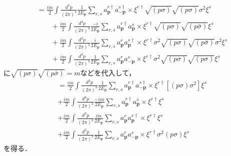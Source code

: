 \begin{align*}
  & = \frac{im}{2} \int \frac{d^3p}{(2\pi)^3} \frac{1}{2E_{\boldsymbol{p}}} \sum_{r, s} a_{\boldsymbol{p}}^{r\dagger} a_{-\boldsymbol{p}}^{s\dagger}
  \times \xi^{r\dagger} \sqrt{(p \sigma)} \sqrt{(p \sigma)} \sigma^2 \xi^s \\
  & \qquad + \frac{im}{2} \int \frac{d^3p}{(2\pi)^3} \frac{-i}{2E_{\boldsymbol{p}}} \sum_{r, s} a_{\boldsymbol{p}}^{r\dagger} a_{\boldsymbol{p}}^{s}
  \times \xi^{r\dagger} \sqrt{(p \sigma)} \sqrt{(p \bar\sigma)} \xi^s \\
  & \qquad + \frac{im}{2} \int \frac{d^3p}{(2\pi)^3} \frac{i}{2E_{\boldsymbol{p}}} \sum_{r, s} a_{\boldsymbol{p}}^{r} a_{\boldsymbol{p}}^{s\dagger}
  \times \xi^{r\dagger} \sigma^2 \sqrt{(p \sigma)} \sqrt{(p \bar\sigma)} \sigma^2 \xi^s \\
  & \qquad + \frac{im}{2} \int \frac{d^3p}{(2\pi)^3} \frac{1}{2E_{\boldsymbol{p}}} \sum_{r, s} a_{\boldsymbol{p}}^{r} a_{-\boldsymbol{p}}^{s}
  \times \xi^{r\dagger} \sigma^2 \sqrt{(p \sigma)} \sqrt{(p \sigma)} \xi^s
\end{align*}
に$\sqrt{(p \sigma)} \sqrt{(p \bar\sigma)} = m$などを代入して，
\begin{align}
  & = \frac{im}{2} \int \frac{d^3p}{(2\pi)^3} \frac{1}{2E_{\boldsymbol{p}}} \sum_{r, s} a_{\boldsymbol{p}}^{r\dagger} a_{-\boldsymbol{p}}^{s\dagger} \times \xi^{r\dagger} \left[ (p \sigma)\sigma^2 \right] \xi^s \label{prob3_4_H_2_1} \\
  & + \frac{im}{2} \int \frac{d^3p}{(2\pi)^3} \frac{-im}{2E_{\boldsymbol{p}}} \sum_{r, s} a_{\boldsymbol{p}}^{r\dagger} a_{\boldsymbol{p}}^{s} \times \xi^{r\dagger} \xi^s \label{prob3_4_H_2_2} \\
  & + \frac{im}{2} \int \frac{d^3p}{(2\pi)^3} \frac{im}{2E_{\boldsymbol{p}}} \sum_{r, s} a_{\boldsymbol{p}}^{r} a_{\boldsymbol{p}}^{s\dagger} \times \xi^{r\dagger} \xi^s \label{prob3_4_H_2_3} \\
  & + \frac{im}{2} \int \frac{d^3p}{(2\pi)^3} \frac{1}{2E_{\boldsymbol{p}}} \sum_{r, s} a_{\boldsymbol{p}}^{r} a_{-\boldsymbol{p}}^{s} \times \xi^{r\dagger} \sigma^2 (p \sigma) \xi^s \label{prob3_4_H_2_4}
\end{align}
を得る．

